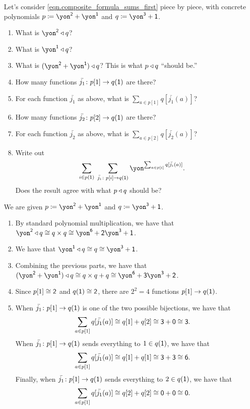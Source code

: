 \documentclass[Book-Poly]{subfiles}
\begin{document}
\begin{exercise}
Let's consider \eqref{eqn.composite_formula_sums_first} piece by piece, with concrete polynomials $p\coloneqq\yon^\2+\yon^\1$ and $q\coloneqq \yon^\3+\1$.
\begin{enumerate}
	\item What is $\yon^\2\tri q$? 
	\item What is $\yon^\1\tri q$?
	\item What is $(\yon^\2+\yon^\1)\tri q$? This is what $p\mathbin{\triangleleft} q$ ``should be.''
	\item How many functions $\bar{j_1}\colon p[1]\to q(\textsf{1})$ are there?
	\item For each function $\bar{j_1}$ as above, what is $\sum_{a\in p[1]} q[\bar{j_1}(a)]$?
	\item How many functions $\bar{j_2}\colon p[2]\to q(\textsf{1})$ are there?
	\item For each function $\bar{j_2}$ as above, what is $\sum_{a\in p[2]} q[\bar{j_2}(a)]$?
	\item Write out \[\sum_{i\in p(\1)}\;\sum_{\bar{j_i}\colon p[i]\to q(\1)}\yon^{\sum_{a\in p[i]}q[\bar{j_i}(a)]}.\]
	Does the result agree with what $p\mathbin{\triangleleft} q$ should be?
\qedhere
\end{enumerate}
\begin{solution}
We are given $p\coloneqq\yon^\2+\yon^\1$ and $q\coloneqq \yon^\3+\1$.
\begin{enumerate}
    \item By standard polynomial multiplication, we have that $\yon^\2 \tri q \iso q \times q \iso \yon^\6 + \2\yon^\3 + \1$.
    \item We have that $\yon^\1 \tri q \iso q \iso \yon^\3 + \1$.
    \item Combining the previous parts, we have that $(\yon^\2 + \yon^\1) \tri q \iso q \times q + q \iso \yon^\6 + \3\yon^\3 + \2$.
    \item Since $p[1] \cong \textsf{2}$ and $q(\textsf{1}) \cong \textsf{2}$, there are $2^2 = 4$ functions $p[1] \to q(\textsf{1})$.
    \item When $\bar{j_1} \colon p[1] \to q(\textsf{1})$ is one of the two possible bijections, we have that
    \[
        \sum_{a \in p[1]} q[\bar{j_1}(a)] \cong q[1] + q[2] \cong \textsf{3} + \textsf{0} \cong \textsf{3}.
    \]
    When $\bar{j_1} \colon p[1] \to q(\textsf{1})$ sends everything to $1 \in q(\textsf{1})$, we have that
    \[
        \sum_{a \in p[1]} q[\bar{j_1}(a)] \cong q[1] + q[1] \cong \textsf{3} + \textsf{3} \cong \textsf{6}.
    \]
    Finally, when $\bar{j_1} \colon p[1] \to q(\textsf{1})$ sends everything to $2 \in q(\textsf{1})$, we have that
    \[
        \sum_{a \in p[1]} q[\bar{j_1}(a)] \cong q[2] + q[2] \cong \textsf{0} + \textsf{0} \cong \textsf{0}.
\]
\end{enumerate}
\end{solution}
\end{exercise}
\end{document}
